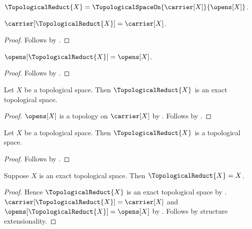 \begin{definition}\label{topological_reduct}
    $\TopologicalReduct{X}
        =\TopologicalSpaceOn{\carrier[X]}{\opens[X]}$.
\end{definition}

\begin{proposition}\label{topological_reduct_carrier}
    $\carrier[\TopologicalReduct{X}]=\carrier[X]$.
\end{proposition}
\begin{proof}
    Follows by
        .
\end{proof}

\begin{proposition}\label{topological_reduct_opens}
    $\opens[\TopologicalReduct{X}]=\opens[X]$.
\end{proposition}
\begin{proof}
    Follows by
        .
\end{proof}

\begin{theorem}\label{topological_reduct_is_exact}
    Let $X$ be a topological space.
    Then $\TopologicalReduct{X}$ is an exact topological space.
\end{theorem}
\begin{proof}
    $\opens[X]$ is a topology on $\carrier[X]$ by
        .
    Follows by
        .
\end{proof}

\begin{classification}\label{topological_reduct_is_topological_space}
    Let $X$ be a topological space.
    Then $\TopologicalReduct{X}$ is a topological space.
\end{classification}
\begin{proof}
    Follows by .
\end{proof}

\begin{theorem}\label{topological_reduct_of_exact}
    Suppose $X$ is an exact topological space.
    Then $\TopologicalReduct{X}=X$.
\end{theorem}
\begin{proof}
    Hence $\TopologicalReduct{X}$ is an exact topological space by
        .
    $\carrier[\TopologicalReduct{X}]=\carrier[X]$ and
        $\opens[\TopologicalReduct{X}]=\opens[X]$ by
        .
    Follows by structure extensionality.
\end{proof}

